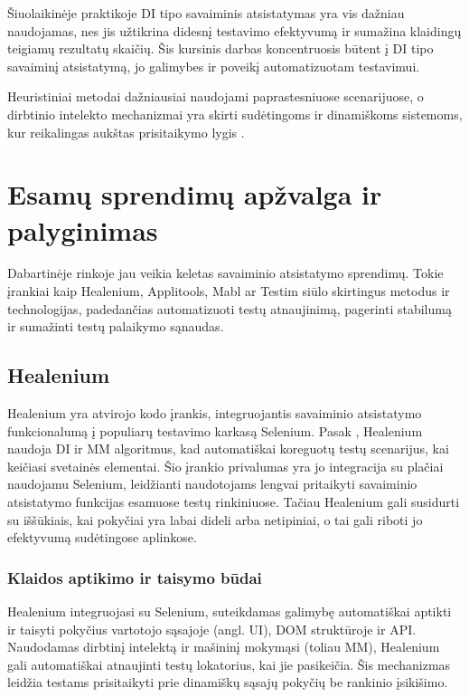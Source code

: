 \documentclass[
]{VUMIFPSkursinis}
\begin{document}
Šiuolaikinėje praktikoje DI tipo savaiminis atsistatymas yra vis dažniau naudojamas, nes jis užtikrina didesnį testavimo efektyvumą ir sumažina klaidingų teigiamų rezultatų skaičių. Šis kursinis darbas koncentruosis būtent į DI tipo savaiminį atsistatymą, jo galimybes ir poveikį automatizuotam testavimui.

Heuristiniai metodai dažniausiai naudojami paprastesniuose scenarijuose, o dirbtinio intelekto mechanizmai yra skirti sudėtingoms ir dinamiškoms sistemoms, kur reikalingas aukštas prisitaikymo lygis \cite{goodfellow2016}.

\section{Esamų sprendimų apžvalga ir palyginimas}

Dabartinėje rinkoje jau veikia keletas savaiminio atsistatymo sprendimų. Tokie įrankiai kaip Healenium, Applitools, Mabl ar Testim siūlo skirtingus metodus ir technologijas, padedančias automatizuoti testų atnaujinimą, pagerinti stabilumą ir sumažinti testų palaikymo sąnaudas.

\subsection{Healenium} 

Healenium yra atvirojo kodo įrankis, integruojantis savaiminio atsistatymo funkcionalumą į populiarų testavimo karkasą Selenium. Pasak \cite{Khankhoje2023}, Healenium naudoja DI ir MM algoritmus, kad automatiškai koreguotų testų scenarijus, kai keičiasi svetainės elementai. Šio įrankio privalumas yra jo integracija su plačiai naudojamu Selenium, leidžianti naudotojams lengvai pritaikyti savaiminio atsistatymo funkcijas esamuose testų rinkiniuose. Tačiau Healenium gali susidurti su iššūkiais, kai pokyčiai yra labai dideli arba netipiniai, o tai gali riboti jo efektyvumą sudėtingose aplinkose. \cite{Healenium}

\subsubsection{Klaidos aptikimo ir taisymo būdai}

Healenium integruojasi su Selenium, suteikdamas galimybę automatiškai aptikti ir taisyti pokyčius vartotojo sąsajoje (angl. UI), DOM struktūroje ir API. Naudodamas dirbtinį intelektą ir mašininį mokymąsi (toliau MM), Healenium gali automatiškai atnaujinti testų lokatorius, kai jie pasikeičia. Šis mechanizmas leidžia testams prisitaikyti prie dinamiškų sąsajų pokyčių be rankinio įsikišimo.
\end{document}
